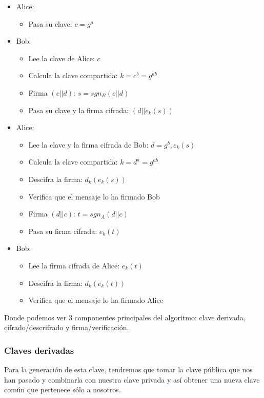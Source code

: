\documentclass[a4paper, 11pt]{article}
\begin{document}
		\begin{itemize}
			\item Alice:
			\begin{itemize}
				\item Pasa su clave: $c = g^a$
			\end{itemize}
			\item Bob:
			\begin{itemize}
				\item Lee la clave de Alice: $c$
				\item Calcula la clave compartida: $k = c^b = g^{ab}$
				\item Firma $(c || d)$: $s = sgn_B (c || d)$
				\item Pasa su clave y la firma cifrada: $(d || e_k(s))$
			\end{itemize}
			\item Alice:
			\begin{itemize}
				\item Lee la clave y la firma cifrada de Bob: $d = g^b, e_k(s)$
				\item Calcula la clave compartida: $k = d^a = g^{ab}$
				\item Descifra la firma: $d_k(e_k(s))$
				\item Verifica que el mensaje lo ha firmado Bob
				\item Firma $(d || c)$: $t = sgn_A (d || c)$
				\item Pasa su firma cifrada: $e_k(t)$
			\end{itemize}
			\item Bob:
			\begin{itemize}
				\item Lee la firma cifrada de Alice: $e_k(t)$
				\item Descifra la firma: $d_k(e_k(t))$
				\item Verifica que el mensaje lo ha firmado Alice
			\end{itemize}
		\end{itemize}
		
		Donde podemos ver 3 componentes principales del algoritmo: clave derivada, cifrado/descrifrado y firma/verificación.
		
		\subsubsection{Claves derivadas}
			Para la generación de esta clave, tendremos que tomar la clave pública que nos han pasado y combinarla con nuestra
			clave privada y así obtener una nueva clave común que pertenece sólo a nosotros.
			
\end{document}
